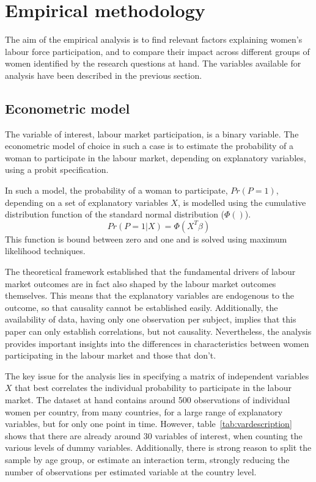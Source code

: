 \section{Empirical methodology}\label{sec:methodology}

The aim of the empirical analysis is to find relevant  factors explaining women's labour force participation, and to compare their impact across different groups of women identified by the research questions at hand. The  variables available for analysis have been described in the previous section.

\subsection{Econometric model}
The variable of interest, labour market participation, is a binary variable. The econometric model of choice in such a case is to estimate the probability of a woman to participate in the labour market, depending on explanatory variables, using a probit specification. 

In such a model, the probability of a woman to participate, $Pr(P=1)$, depending on a set of explanatory variables $X$, is modelled using the cumulative distribution function of the standard normal distribution ($\Phi()$). 
\begin{equation}\label{eq:estimation}
Pr(P=1|X) =\Phi\left(X^T \beta \right)
\end{equation}
This function is bound between zero and one and is solved using maximum likelihood techniques.

The theoretical framework established that the fundamental drivers of labour market outcomes are in fact also shaped by the labour market outcomes themselves. This means that the explanatory variables are endogenous to the outcome, so that  causality cannot be established easily. Additionally, the availability of data, having only one observation per subject, implies that this paper can only establish correlations, but not causality. Nevertheless, the analysis provides important insights into the differences in characteristics between women participating in the labour market and those that don't.

The key issue for the analysis lies in specifying a matrix of independent variables $X$ that best correlates the individual probability to participate in the labour market. The dataset at hand contains around 500 observations of individual women per country, from many countries, for a large range of explanatory variables, but for only one point in time. However, table~\ref{tab:vardescription} shows that there are already around 30 variables of interest, when counting the various levels of dummy variables. Additionally, there is strong reason to split the sample by age group, or estimate an interaction term, strongly reducing the number of observations per estimated variable at the country level. 

